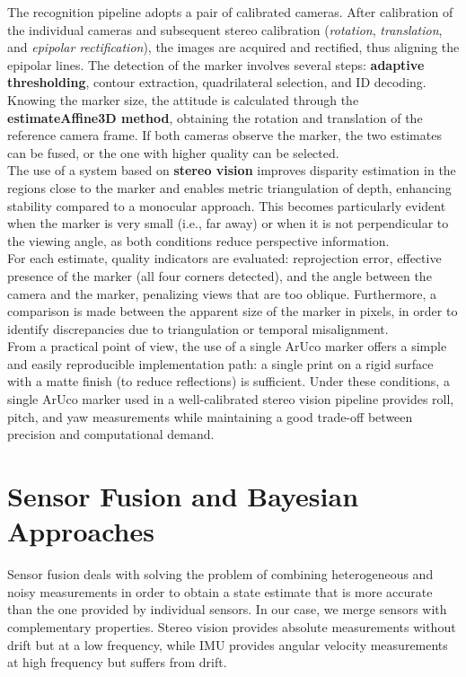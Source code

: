The recognition pipeline adopts a pair of calibrated cameras. After calibration of the individual cameras and subsequent stereo calibration (\textit{rotation}, \textit{translation}, and \textit{epipolar rectification}), the images are acquired and rectified, thus aligning the epipolar lines. The detection of the marker involves several steps: \textbf{adaptive thresholding}, contour extraction, quadrilateral selection, and ID decoding.
\\Knowing the marker size, the attitude is calculated through the \textbf{estimateAffine3D method}, obtaining the rotation and translation of the reference camera frame. If both cameras observe the marker, the two estimates can be fused, or the one with higher quality can be selected.
\\The use of a system based on \textbf{stereo vision} improves disparity estimation in the regions close to the marker and enables metric triangulation of depth, enhancing stability compared to a monocular approach. This becomes particularly evident when the marker is very small (i.e., far away) or when it is not perpendicular to the viewing angle, as both conditions reduce perspective information.
\\For each estimate, quality indicators are evaluated: reprojection error, effective presence of the marker (all four corners detected), and the angle between the camera and the marker, penalizing views that are too oblique. Furthermore, a comparison is made between the apparent size of the marker in pixels, in order to identify discrepancies due to triangulation or temporal misalignment.
\\From a practical point of view, the use of a single ArUco marker offers a simple and easily reproducible implementation path: a single print on a rigid surface with a matte finish (to reduce reflections) is sufficient. Under these conditions, a single ArUco marker used in a well-calibrated stereo vision pipeline provides roll, pitch, and yaw measurements while maintaining a good trade-off between precision and computational demand.
\section{Sensor Fusion and Bayesian Approaches}

Sensor fusion deals with solving the problem of combining heterogeneous and noisy measurements in order to obtain a state estimate that is more accurate than the one provided by individual sensors. In our case, we merge sensors with complementary properties. Stereo vision provides absolute measurements without drift but at a low frequency, while IMU provides angular velocity measurements at high frequency but suffers from drift.


